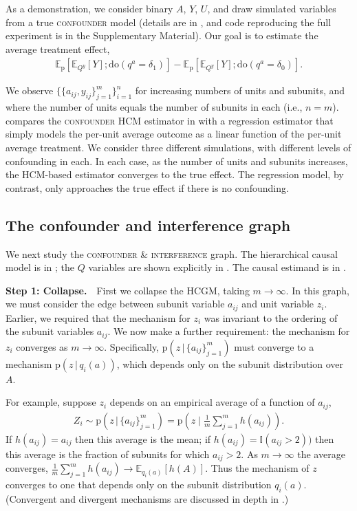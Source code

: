 \documentclass[12pt]{article}
\newcommand{\EE}[2]{\mathbb{E}_{#1}\left[ #2 \right]}
\newcommand{\rmdo}{\mathrm{do}}
\newcommand{\g}{\,\vert\,}
\newcommand{\pr}{\mathrm{p}}
\newcommand{\parheadsmall}[1]{\vspace{0.1in} \noindent \textbf{#1} \,\,}
\begin{document}
As a demonstration, we consider binary $A$, $Y$, $U$, and draw
simulated variables from a true \textsc{confounder} model (details are in , and code reproducing the full experiment is in the Supplementary Material). Our goal is
to estimate the average treatment effect,
\begin{align}  \label{eq:confounder_effect}
  \EE{\pr}{\EE{Q^y}{Y}; \rmdo(q^a = \delta_{1})} -
  \EE{\pr}{\EE{Q^y}{Y}; \rmdo(q^a = \delta_{0})}.
\end{align}

We observe $\{\{a_{ij}, y_{ij}\}_{j=1}^m\}_{i=1}^n$ for
increasing numbers of units and subunits, and where the number of
units equals the number of subunits in each (i.e., $n=m$).
 compares the \textsc{confounder} HCM
estimator in  with a regression estimator
that simply models the per-unit average outcome as a linear function
of the per-unit average treatment. 
We consider three different simulations, with different levels of confounding in each. In each case, as the number of units and subunits
increases, the HCM-based estimator converges to the true effect.
The regression model, by contrast, only approaches the true effect if there is no confounding.

\subsection{The confounder and interference graph} \label{sec:confound_interfere_id}

We next study the \textsc{confounder \& interference} graph. The
hierarchical causal model is in ; the
$Q$ variables are shown explicitly in
. The causal estimand is in
.

\parheadsmall{Step 1: Collapse.} First we collapse the HCGM, taking
$m \rightarrow \infty$. In this graph, we must consider the edge
between subunit variable $a_{ij}$ and unit variable $z_i$. Earlier, we
required that the mechanism for $z_i$ was invariant to the ordering of
the subunit variables $a_{ij}$. We now make a further requirement: the
mechanism for $z_i$ converges as $m \rightarrow \infty$. Specifically,
$\pr(z \g \{a_{ij}\}_{j=1}^m)$ must converge to a mechanism
$\pr(z \g q_i(a))$, which depends only on the subunit distribution
over $A$.



For example, suppose $z_i$ depends on an empirical average of a
function of $a_{ij}$,
\begin{align*}
  Z_i \sim \textstyle
  \pr\left(z \g \{a_{ij}\}_{j=1}^m\right) = \pr\left(z \mid \frac{1}{m} \sum_{j=1}^{m} h(a_{ij})\right).
\end{align*}
If $h(a_{ij}) = a_{ij}$ then this average is the mean; if
$h(a_{ij}) = \mathbb{I}(a_{ij} > 2))$ then this average is the
fraction of subunits for which $a_{ij} > 2$. As $m \rightarrow \infty$
the average converges,
$\frac{1}{m} \sum_{j=1}^{m} h(a_{ij}) \to \EE{q_i(a)}{h(A)}$. Thus the
mechanism of $z$ converges to one that depends only on the subunit
distribution $q_i(a)$.
(Convergent and divergent mechanisms are discussed in depth in .)
\end{document}
